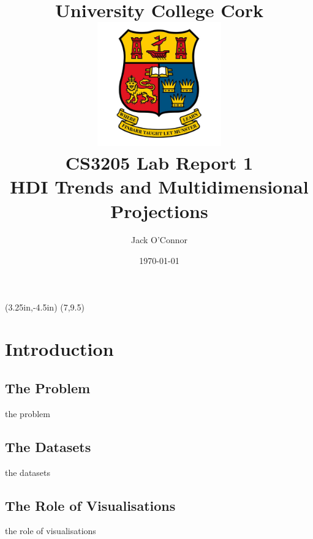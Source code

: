 \documentclass[11pt,a4paper,draft]{article}
\title{ \vspace{3.5cm}
	University College Cork \\ [1cm]
	\includegraphics[width=0.4\textwidth]{ucc_crest} \\ [1cm]
	CS3205 Lab Report 1 \\ [0.5cm]
	HDI Trends and Multidimensional Projections
}
\author{Jack O'Connor}
\date{\today}
\begin{document}
\thisfancyput(3.25in,-4.5in){%
  \setlength{\unitlength}{1in}\fancyoval(7,9.5)}%
\maketitle
\pagebreak
{
\hypersetup{hidelinks}
\tableofcontents
}
\pagebreak
\setcounter{page}{1}


\section{Introduction}
\subsection{The Problem}
the problem

\subsection{The Datasets}
the datasets

\subsection{The Role of Visualisations}
the role of visualisations
\end{document}

